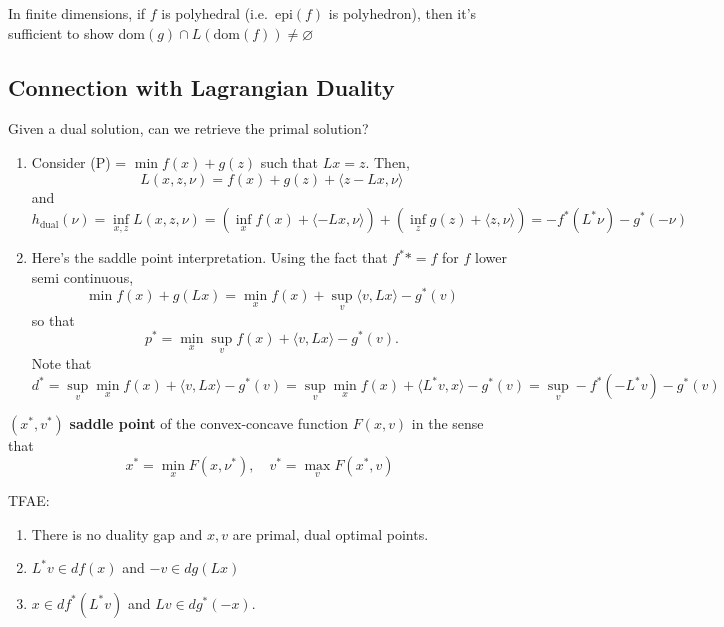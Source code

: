 \documentclass[english, 11pt]{article}
\begin{document}
\begin{thrm}[15.25]
In finite dimensions, if $f$ is polyhedral (i.e.\ epi$(f)$ is polyhedron), then it's sufficient to show dom$(g) \cap L(\text{dom}(f)) \neq \varnothing$
\end{thrm}

\subsection{Connection with Lagrangian Duality}

Given a dual solution, can we retrieve the primal solution?

\begin{enumerate}
\item Consider (P) = $\min \limits f(x) + g(z)$ such that $Lx =z$. Then,
\[
L(x,z,\nu) = f(x) + g(z) + \langle z-Lx, \nu \rangle
\]
and
\[
h_{\text{dual}} (\nu) = \inf \limits_{x,z} L(x,z,\nu) = \left( \inf \limits_x f(x) + \langle -Lx, \nu \rangle \right) + \left( \inf \limits_z g(z) + \langle z, \nu \rangle \right) = - f^*(L^* \nu) -g^*(-\nu)
\]

\item Here's the saddle point interpretation. Using the fact that $f^** = f$ for $f$ lower semi continuous,
\[
\min f(x) + g(Lx) = \min \limits_x f(x) + \sup\limits_v \langle v, Lx \rangle - g^*(v) 
\]
so that 
\[
p^* = \min \limits_x \sup \limits_v f(x) + \langle v, Lx \rangle - g^*(v).
\]
Note that
\[
d^* = \sup \limits_v \min \limits_x f(x) + \langle v, Lx \rangle - g^*(v)
=  \sup \limits_v \min \limits_x f(x) + \langle L^*v, x \rangle - g^*(v)
=\sup \limits_v -f^*(-L^* v) - g^*(v)
\]
\end{enumerate}

\begin{defn}
$(x^*, v^*)$ {\bf saddle point} of the convex-concave function $F(x,v)$ in the sense that
\[
x^* = \min \limits_x F(x,\nu^*), \quad v^* = \max \limits_v F(x^*,v)
\]
\end{defn}

\begin{thrm}[19.1]
TFAE: 
\begin{enumerate}
\item There is no duality gap and $x,v$ are primal, dual optimal points.
\item $L^* v \in df(x)$ and $-v \in dg(Lx)$
\item $x \in d f^*(L^* v)$ and $Lv \in d g^*(-x)$.
\end{enumerate}
\end{thrm}
\end{document}
